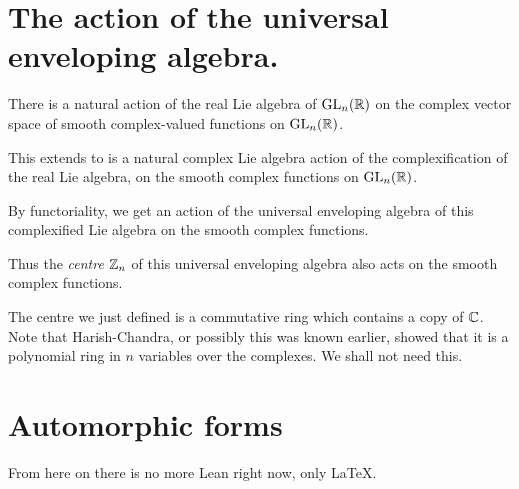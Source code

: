 \section{The action of the universal enveloping algebra.}

\begin{definition}
  \label{instLieAlgebraAction}
There is a natural action of the real Lie algebra of $\operatorname{GL}_n(\mathbb{R})$ on the complex vector space of
smooth complex-valued functions on $\operatorname{GL}_n(\mathbb{R})$.
\end{definition}

\begin{definition}
  \label{instComplexLieAlgebraAction}

  This extends to is a natural complex Lie algebra action of the complexification of
  the real Lie algebra, on the smooth complex functions on $\operatorname{GL}_n(\mathbb{R})$.

\end{definition}

\begin{definition}
  \label{instUniversalEnvelopingAlgebraAction}
By functoriality, we get an action of the universal enveloping algebra of this
complexified Lie algebra on the smooth complex functions.

\end{definition}

\begin{definition}
\label{instCentreAction}
Thus the \emph{centre} $\mathbb{Z}_n$ of this universal enveloping algebra also acts on the smooth
complex functions.

\end{definition}

\begin{remark} The centre we just defined is a commutative ring which contains a copy of $\mathbb{C}$.
  Note that Harish-Chandra, or possibly this was known earlier, showed that it is a polynomial
  ring in $n$ variables over the complexes. We shall not need this.
\end{remark}

\section{Automorphic forms}

From here on there is no more Lean right now, only LaTeX.

